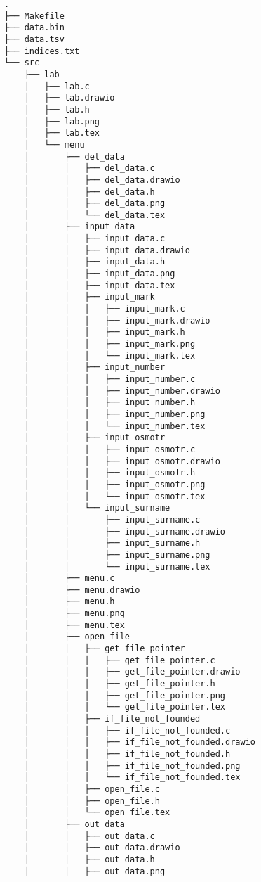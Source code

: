 {

\scriptsize

\begin{verbatim}
.
├── Makefile
├── data.bin
├── data.tsv
├── indices.txt
└── src
    ├── lab
    │   ├── lab.c
    │   ├── lab.drawio
    │   ├── lab.h
    │   ├── lab.png
    │   ├── lab.tex
    │   └── menu
    │       ├── del_data
    │       │   ├── del_data.c
    │       │   ├── del_data.drawio
    │       │   ├── del_data.h
    │       │   ├── del_data.png
    │       │   └── del_data.tex
    │       ├── input_data
    │       │   ├── input_data.c
    │       │   ├── input_data.drawio
    │       │   ├── input_data.h
    │       │   ├── input_data.png
    │       │   ├── input_data.tex
    │       │   ├── input_mark
    │       │   │   ├── input_mark.c
    │       │   │   ├── input_mark.drawio
    │       │   │   ├── input_mark.h
    │       │   │   ├── input_mark.png
    │       │   │   └── input_mark.tex
    │       │   ├── input_number
    │       │   │   ├── input_number.c
    │       │   │   ├── input_number.drawio
    │       │   │   ├── input_number.h
    │       │   │   ├── input_number.png
    │       │   │   └── input_number.tex
    │       │   ├── input_osmotr
    │       │   │   ├── input_osmotr.c
    │       │   │   ├── input_osmotr.drawio
    │       │   │   ├── input_osmotr.h
    │       │   │   ├── input_osmotr.png
    │       │   │   └── input_osmotr.tex
    │       │   └── input_surname
    │       │       ├── input_surname.c
    │       │       ├── input_surname.drawio
    │       │       ├── input_surname.h
    │       │       ├── input_surname.png
    │       │       └── input_surname.tex
    │       ├── menu.c
    │       ├── menu.drawio
    │       ├── menu.h
    │       ├── menu.png
    │       ├── menu.tex
    │       ├── open_file
    │       │   ├── get_file_pointer
    │       │   │   ├── get_file_pointer.c
    │       │   │   ├── get_file_pointer.drawio
    │       │   │   ├── get_file_pointer.h
    │       │   │   ├── get_file_pointer.png
    │       │   │   └── get_file_pointer.tex
    │       │   ├── if_file_not_founded
    │       │   │   ├── if_file_not_founded.c
    │       │   │   ├── if_file_not_founded.drawio
    │       │   │   ├── if_file_not_founded.h
    │       │   │   ├── if_file_not_founded.png
    │       │   │   └── if_file_not_founded.tex
    │       │   ├── open_file.c
    │       │   ├── open_file.h
    │       │   └── open_file.tex
    │       ├── out_data
    │       │   ├── out_data.c
    │       │   ├── out_data.drawio
    │       │   ├── out_data.h
    │       │   ├── out_data.png

\end{verbatim}}

